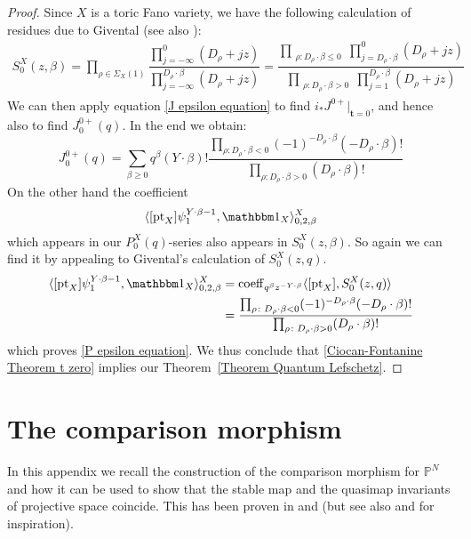 \documentclass[11pt]{amsart}
\newcommand{\PP}{\mathbb P}
\newcommand{\pt}{\operatorname{pt}}
\theoremstyle{definition}
\theoremstyle{definition}
\begin{document}
\begin{proof}
Since $X$ is a toric Fano variety, we have the following calculation of residues due to Givental \cite{Givental-mirror} (see also \cite[Definition 7.2.8]{CF-K}):
\begin{align*}
S_0^X(z,\beta) =\prod_{\rho\in\Sigma_X(1)}\dfrac{\prod_{j=-\infty}^0(D_{\rho}+jz)}{\prod_{j=-\infty}^{D_{\rho}\cdot \beta}(D_\rho+jz)}
=\dfrac{\prod_{\substack{\rho \colon D_\rho \cdot \beta\leq 0}} \prod_{j=D_\rho \cdot \beta}^0 (D_{\rho}+jz)}{\prod_{\substack{\rho\colon D_\rho \cdot\beta > 0}} \prod_{j=1}^{D_\rho\cdot\beta} (D_{\rho}+jz)}
\end{align*}
We can then apply equation \eqref{J epsilon equation} to find $i_*J^{0+}|_{\mathbf{t}=0}$, and hence also to find $J^{0+}_0(q)$. In the end we obtain:
\begin{equation*}
 J^{0+}_0(q)=\sum_{\beta\geq 0}q^\beta(Y\cdot\beta)!\frac{\prod_{\rho\colon D_\rho\cdot\beta< 0}(-1)^{-D_{\rho}\cdot\beta}(-D_{\rho}\cdot\beta)!}{\prod_{\rho\colon D_\rho\cdot\beta> 0}(D_{\rho}\cdot\beta)!}
\end{equation*}
On the other hand the coefficient
\begin{equation*} \langle[\pt_X]\psi_1^{Y\cdot\beta-1},\mathbbm 1_X\rangle_{0,2,\beta}^X\end{equation*}
which appears in our $P_0^X(q)$-series also appears in $S_0^X(z,\beta)$. So again we can find it by appealing to Givental's calculation of $S_0^X(z,q)$.
\begin{align*}
 \langle[\pt_X]\psi_1^{Y\cdot\beta-1},\mathbbm 1_X\rangle_{0,2,\beta}^X &=\operatorname{coeff}_{q^\beta z^{-Y\cdot\beta}}\langle [\pt_X],S_0^X(z,q) \rangle\\
& =\frac{\prod_{\rho\colon D_\rho\cdot\beta< 0}(-1)^{-D_{\rho}\cdot\beta}(-D_{\rho}\cdot\beta)!}{\prod_{\rho\colon D_\rho\cdot\beta> 0}(D_{\rho}\cdot\beta)!}
\end{align*}
which proves \eqref{P epsilon equation}. We thus conclude that \eqref{Ciocan-Fontanine Theorem t zero} implies our Theorem~\ref{Theorem Quantum Lefschetz}. \end{proof}

\appendix

\section{The comparison morphism} \label{Section comparison morphism}
In this appendix we recall the construction of the comparison morphism for $\PP^N$ and how it can be used to show that the stable map and the quasimap invariants of projective space coincide. This has been proven in \cite[Theorem 3]{MOP} and \cite[Section 4.3]{Manolache-Push} (but see also \cite[Proposition 4.1]{Bertram} and \cite[Theorem 7.1]{Popa-Roth} for inspiration).
\end{document}
